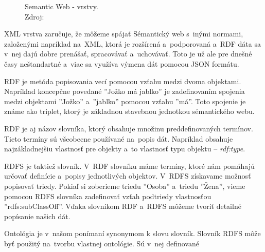 \documentclass[12pt, a4paper, oneside]{book}
\begin{document}
\begin{figure}
\label{fig:semantic_web}
\caption{Semantic Web - vrstvy.\\Zdroj: \cite{semanticweb}}

\end{figure}

XML vrstva zaručuje, že môžeme spájať Sémantický web s~inými normami, založenými napríklad na~XML, ktorá je rozšírená a~podporovaná a~RDF dáta sa v~nej dajú dobre prenášať, spracovávať a~uchovávať. Toto je už ale pre dnešné časy neštandartné a~viac sa využíva výmena dát pomocou JSON formátu. 


RDF je metóda popisovania vecí pomocou vzťahu medzi dvoma objektami. Napríklad koncepčne povedané ''Jožko má jablko'' je zadefinovaním spojenia medzi objektami ''Jožko'' a~''jablko'' pomocou vzťahu ''má''.
Toto spojenie je známe ako triplet, ktorý je základnou stavebnou jednotkou sémantického webu. 


RDF je aj názov slovníka, ktorý obsahuje množinu preddefinovaných termínov. Tieto termíny sú všeobecne používané na~popis dát. Napríklad obsahuje najzákladnejšiu vlastnosť pre objekty a~to vlastnosť typu objektu -- \textit{rdf:type}. 


RDFS je taktiež slovník. V~RDF slovníku máme termíny, ktoré nám pomáhajú určovať definície a~popisy jednotlivých objektov. V~RDFS získavame možnosť popisovať triedy. Pokiaľ si zoberieme triedu ''Osoba'' a~triedu ''Žena'', vieme pomocou RDFS slovníka zadefinovať vzťah podtriedy vlastnosťou ''rdfs:subClassOff''. Vďaka slovníkom RDF a~RDFS môžeme tvoriť detailné popísanie našich dát.


Ontológia je v~našom ponímaní synonymom k slovu slovník. Slovník RDFS môže byť použitý na~tvorbu vlastnej ontológie. Sú v~nej definované 
\end{document}
